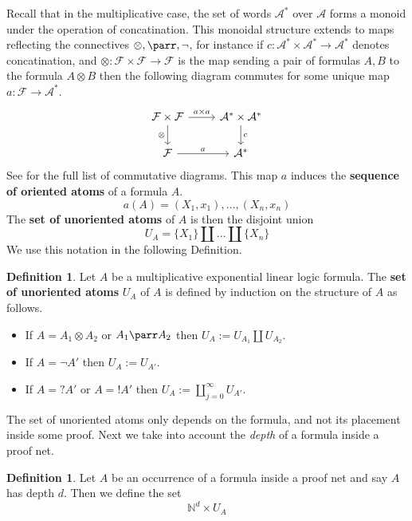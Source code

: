 \documentclass[12pt]{article}
\theoremstyle{plain}
\theoremstyle{definition}
\newtheorem{defn}[thm]{Definition} %
\newcommand{\bb}[1]{\mathbb{#1}}
\newcommand{\call}[1]{\mathcal{#1}}
\newcommand{\lto}{\longrightarrow}
\begin{document}
Recall that in the multiplicative case, the set of words $\call{A}^\ast$ over $\call{A}$ forms a monoid under the operation of concatination. This monoidal structure extends to maps reflecting the connectives $\otimes, \parr, \neg$, for instance if $c: \call{A}^\ast \times \call{A}^\ast \lto \call{A}^\ast$ denotes concatination, and $\otimes: \call{F} \times \call{F} \lto \call{F}$ is the map sending a pair of formulas $A,B$ to the formula $A \otimes B$ then the following diagram commutes for some unique map $a: \call{F} \lto \call{A}^\ast$.
\begin{equation}
\begin{tikzcd}
\call{F} \times \call{F}\arrow[r,"{a \times a}"]\arrow[d,swap,"{\otimes}"] & \call{A}^\ast \times \call{A}^\ast\arrow[d,"{c}"]\\
\call{F}\arrow[r,"{a}"] & \call{A}^\ast
\end{tikzcd}
\end{equation}
See \cite[Definition 3.5, 3.6]{MT} for the full list of commutative diagrams. This map $a$ induces the \textbf{sequence of oriented atoms} of a formula $A$.
\begin{equation}
a(A) = (X_1, x_1), \ldots, (X_n, x_n)
\end{equation}
The \textbf{set of unoriented atoms} of $A$ is then the disjoint union
\begin{equation}
U_A = \{ X_1 \} \coprod \ldots \coprod \{ X_n \}
\end{equation}
We use this notation in the following Definition.
\begin{defn}\label{def:unoriented_atoms}
Let $A$ be a multiplicative exponential linear logic formula. The \textbf{set of unoriented atoms} $U_A$ of $A$ is defined by induction on the structure of $A$ as follows.
\begin{itemize}
	\item If $A = A_1 \otimes A_2$ or $A_1 \parr A_2$ then $U_A := U_{A_1} \coprod U_{A_2}$.
	\item If $A = \neg A'$ then $U_{A} := U_{A'}$.
	\item If $A = ?A'$ or $A = !A'$ then $U_A := \coprod_{j = 0}^\infty U_{A'}$.
\end{itemize}
\end{defn}

The set of unoriented atoms only depends on the formula, and not its placement inside some proof. Next we take into account the \emph{depth} of a formula inside a proof net.

\begin{defn}
Let $A$ be an occurrence of a formula inside a proof net and say $A$ has depth $d$. Then we define the set
\begin{equation}
\bb{N}^d \times U_A
\end{equation}
\end{defn}
\end{document}
